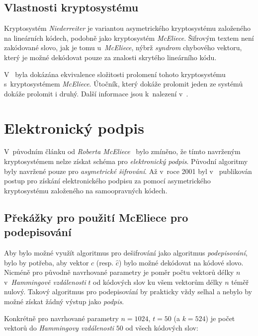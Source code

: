 \documentclass[thesis=M,czech,hidelinks]{FITthesis}[2012/06/26]
\newcommand{\0}{{\textcolor[gray]{0.80}{0}}}
\begin{document}
\subsection{Vlastnosti kryptosystému}

Kryptosystém \emph{Niederreiter} je variantou asymetrického kryptosystému
založeného na lineárních kódech, podobně jako kryptosystém \emph{McEliece}.
Šifrovým textem není zakódované slovo, jak je tomu u~\emph{McEliece}, nýbrž
\emph{syndrom} chybového vektoru, který je možné dekódovat pouze za znalosti
skrytého lineárního kódu.

V~\cite{XingLi} byla dokázána ekvivalence složitosti prolomení tohoto
kryptosystému s~kryptosystémem \emph{McEliece}. Útočník, který dokáže prolomit
jeden ze systémů dokáže prolomit i druhý. Další informace jsou k~nalezení
v~\cite{Niederreiter,Courtois}.



\section{Elektronický podpis}

V~původním článku od \emph{Roberta McEliece}~\cite{McEliece} bylo zmíněno, že
tímto navrženým kryptosystémem nelze získat schéma pro \emph{elektronický
podpis}.  Původní algoritmy byly navržené pouze pro \emph{asymetrické
šifrování}. Až v~roce 2001 byl v~\cite{Courtois} publikován postup pro získání
elektronického podpisu za pomocí asymetrického kryptosystému založeného na
samoopravných kódech.

\subsection{Překážky pro použití McEliece pro podepisování}

Aby bylo možné využít algoritmus pro dešifrování jako algoritmus
\emph{podepisování}, bylo by potřeba, aby vektor $c$ (resp. $\hat{c}$) bylo
možné dekódovat na kódové slovo. Nicméně pro původně navrhované parametry je
poměr počtu vektorů délky $n$ v~\emph{Hammingově vzdálenosti} $t$ od kódových
slov ku všem vektorům délky $n$ téměř nulový. Takový algoritmus pro podepisování
by prakticky vždy selhal a nebylo by možné získat žádný výstup jako
\emph{podpis}.

Konkrétně pro navrhované parametry $n=1024$, $t=50$ (a $k=524$) je počet vektorů
do \emph{Hammingovy vzdálenosti} $50$ od všech kódových slov:
\end{document}
